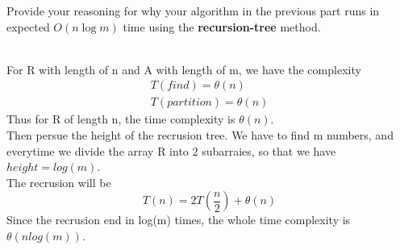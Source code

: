 \begin{parts}
\begin{subparts}
    \newpage

    \subpart[2] Provide your reasoning for why your algorithm in the previous part runs in expected $O(n\log m)$ time using the \textbf{recursion-tree} method.
    \begin{solution} \\
      For R with length of n and A with length of m, we have the complexity
      \begin{equation}
        \begin{array}{l}
          T(find) = \theta(n) \\
          T(partition) = \theta(n)
        \end{array}
      \end{equation}
      Thus for R of length n, the time complexity is $\theta(n)$. \\
      Then persue the height of the recrusion tree.
      We have to find m numbers, and everytime we divide the array R into 2 subarraies, so that we have $height = log(m)$. \\
      The recrusion will be
      \begin{equation}
        T(n) = 2T(\frac{n}{2}) + \theta(n)
      \end{equation}
      Since the recrusion end in log(m) times, the whole time complexity is $\theta(nlog(m))$.
    \end{solution}

  \end{subparts}

\end{parts}